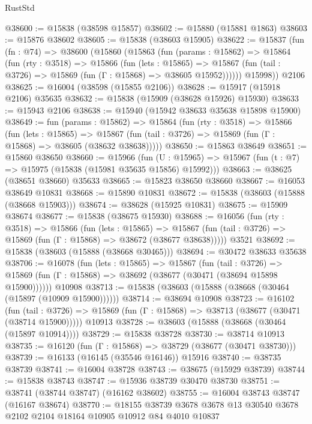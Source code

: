 \begin{lexlean}{RustStd}
\begin{coremodule}
@38600 := @15838 (@38598 @15857)
@38602 := @15880 (@15881 @1863)
@38603 := @15876 @38602
@38605 := @15838 (@38603 @15905)
@38622 := @15837
    (fun (fn : @74) =>
    @38600
      (@15860
        (@15863
          (fun (params : @15862) =>
          @15864
            (fun (rty : @3518) =>
            @15866
              (fun (lets : @15865) =>
              @15867 (fun (tail : @3726) => @15869 (fun (Γ : @15868) => @38605 @15952))))))
        @15998))
    @2106
@38625 := @16004 (@38598 (@15855 @2106))
@38628 := @15917 (@15918 @2106) @35635
@38632 := @15838 (@15909 (@38628 @15926) @15930)
@38633 := @15943 @2106
@38638 := @15940 (@15942 @38633 @35638 @15898 @15900)
@38649 := fun (params : @15862) =>
  @15864
    (fun (rty : @3518) =>
    @15866
      (fun (lets : @15865) =>
      @15867 (fun (tail : @3726) => @15869 (fun (Γ : @15868) => @38605 (@38632 @38638)))))
@38650 := @15863 @38649
@38651 := @15860 @38650
@38660 := @15966
    (fun (U : @15965) => @15967 (fun (t : @7) => @15975 (@15838 (@15981 @35635 @15856) @15992)))
@38663 := @38625 (@38651 @38660) @35633
@38665 := @15823 @38650 @38660
@38667 := @16053 @38649 @10831
@38668 := @15890 @10831
@38672 := @15838 (@38603 (@15888 (@38668 @15903)))
@38674 := @38628 (@15925 @10831)
@38675 := @15909 @38674
@38677 := @15838 (@38675 @15930)
@38688 := @16056
    (fun (rty : @3518) =>
    @15866
      (fun (lets : @15865) =>
      @15867 (fun (tail : @3726) => @15869 (fun (Γ : @15868) => @38672 (@38677 @38638)))))
    @3521
@38692 := @15838 (@38603 (@15888 (@38668 @30465)))
@38694 := @30472 @38633 @35638
@38706 := @16078
    (fun (lets : @15865) =>
    @15867
      (fun (tail : @3726) =>
      @15869 (fun (Γ : @15868) => @38692 (@38677 (@30471 (@38694 @15898 @15900))))))
    @10908
@38713 := @15838 (@38603 (@15888 (@38668 (@30464 (@15897 (@10909 @15900))))))
@38714 := @38694 @10908
@38723 := @16102
    (fun (tail : @3726) => @15869 (fun (Γ : @15868) => @38713 (@38677 (@30471 (@38714 @15900)))))
    @10913
@38728 := @38603 (@15888 (@38668 (@30464 (@15897 @10914))))
@38729 := @15838 @38728
@38730 := @38714 @10913
@38735 := @16120 (fun (Γ : @15868) => @38729 (@38677 (@30471 @38730)))
@38739 := @16133 (@16145 (@35546 @16146)) @15916
@38740 := @38735 @38739
@38741 := @16004 @38728
@38743 := @38675 (@15929 @38739)
@38744 := @15838 @38743
@38747 := @15936 @38739 @30470 @38730
@38751 := @38741 (@38744 @38747) (@16162 @38602)
@38755 := @16004 @38743 @38747 (@16167 @38674)
@38770 := @18155
    @38739
    @3678
    @3678
    @13
    @30540
    @3678
    @2102
    @2104
    @18164
    @10905
    @10912
    @84
    @4010
    @10837

\end{coremodule}
\end{lexlean}
